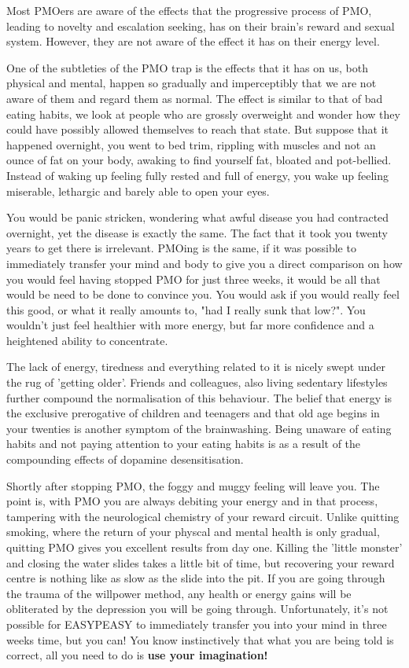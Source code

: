 \documentclass[easypeasy.tex]{subfiles}
\begin{document}
Most PMOers are aware of the effects that the progressive process of PMO, leading to novelty and escalation seeking, has on their brain's reward and sexual system. However, they are not aware of the effect it has on their energy level.

One of the subtleties of the PMO trap is the effects that it has on us, both physical and mental, happen so gradually and imperceptibly that we are not aware of them and regard them as normal. The effect is similar to that of bad eating habits, we look at people who are grossly overweight and wonder how they could have possibly allowed themselves to reach that state. But suppose that it happened overnight, you went to bed trim, rippling with muscles and not an ounce of fat on your body, awaking to find yourself fat, bloated and pot-bellied. Instead of waking up feeling fully rested and full of energy, you wake up feeling miserable, lethargic and barely able to open your eyes.

You would be panic stricken, wondering what awful disease you had contracted overnight, yet the disease is exactly the same. The fact that it took you twenty years to get there is irrelevant. PMOing is the same, if it was possible to immediately transfer your mind and body to give you a direct comparison on how you would feel having stopped PMO for just three weeks, it would be all that would be need to be done to convince you. You would ask if you would really feel this good, or what it really amounts to, "had I really sunk that low?". You wouldn't just feel healthier with more energy, but far more confidence and a heightened ability to concentrate.

The lack of energy, tiredness and everything related to it is nicely swept under the rug of 'getting older'. Friends and colleagues, also living sedentary lifestyles further compound the normalisation of this behaviour. The belief that energy is the exclusive prerogative of children and teenagers and that old age begins in your twenties is another symptom of the brainwashing. Being unaware of eating habits and not paying attention to your eating habits is as a result of the compounding effects of dopamine desensitisation.

Shortly after stopping PMO, the foggy and muggy feeling will leave you. The point is, with PMO you are always debiting your energy and in that process, tampering with the neurological chemistry of your reward circuit. Unlike quitting smoking, where the return of your physcal and mental health is only gradual, quitting PMO gives you excellent results from day one. Killing the 'little monster' and closing the water slides takes a little bit of time, but recovering your reward centre is nothing like as slow as the slide into the pit. If you are going through the trauma of the willpower method, any health or energy gains will be obliterated by the depression you will be going through. Unfortunately, it's not possible for EASYPEASY to immediately transfer you into your mind in three weeks time, but you can! You know instinctively that what you are being told is correct, all you need to do is \textbf{use your imagination!}
\end{document}
